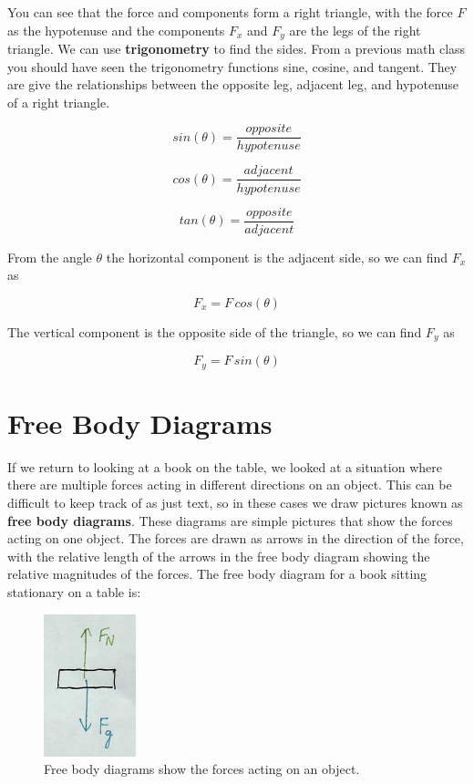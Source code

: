 \documentclass[12pt]{book}
\begin{document}
You can see that the force and components form a right triangle, with the force $F$ as the hypotenuse and the components $F_x$ and $F_y$ are the legs of the right triangle. We can use \textbf{trigonometry} to find the sides. From a previous math class you should have seen the trigonometry functions sine, cosine, and tangent. They are give the relationships between the opposite leg, adjacent leg, and hypotenuse of a right triangle.

\begin{equation}
sin(\theta) = \frac{opposite}{hypotenuse}
\end{equation}

\begin{equation}
cos(\theta) = \frac{adjacent}{hypotenuse}
\end{equation}

\begin{equation}
tan(\theta) = \frac{opposite}{adjacent}
\end{equation}

From the angle $\theta$ the horizontal component is the adjacent side, so we can find $F_x$ as

\begin{equation}
F_x = F \, cos(\theta)
\end{equation}

The vertical component is the opposite side of the triangle, so we can find $F_y$ as

\begin{equation}
F_y = F \, sin(\theta)
\end{equation}

\section{Free Body Diagrams}

If we return to looking at a book on the table, we looked at a situation where there are multiple forces acting in different directions on an object. This can be difficult to keep track of as just text, so in these cases we draw pictures known as \textbf{free body diagrams}. These diagrams are simple pictures that show the forces acting on one object. The forces are drawn as arrows in the direction of the force, with the relative length of the arrows in the free body diagram showing the relative magnitudes of the forces. The free body diagram for a book sitting stationary on a table is:

\begin{figure}[H]
\centering
\includegraphics[scale=1.0]{fdb_intro.png}
\caption{Free body diagrams show the forces acting on an object.}
\label{fbdintro}
\end{figure}
\end{document}
